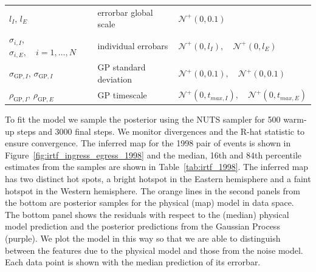 \documentclass[modern]{aastex62}
\begin{document}
\begin{table}[t!]
\begin{center}
\begin{longtable}{W{l}{4cm} W{l}{4cm} W{l}{6cm}}
            \\
            $l_I$, $l_E$& errorbar global scale&$\mathcal{N}^+(0,0.1)$
            \\
            $\sigma_{i,I}$, $\sigma_{i,E},\quad i=1,\dots,N$& individual errobars&
            $\mathcal{N}^+(0,l_I),\quad \mathcal{N}^+(0,l_E)$
            \\
            $\sigma_{\mathrm{GP}, I}$, $\sigma_{\mathrm{GP}, I}$ & GP standard deviation&$\mathcal{N}^+(0,0.1),\quad \mathcal{N}^+(0,0.1)$
            \\
            $\rho_{\mathrm{GP},I}$, $\rho_{\mathrm{GP},E}$ & GP timescale  & $\mathcal{N}^+(0, t_{max, I}),\quad  \mathcal{N}^+(0, t_{max, E})$
        \\
        \end{longtable}
    \end{center}
\end{table}

To fit the model we sample the posterior using the NUTS sampler for 500 warm-up steps and 3000 final steps.
We monitor divergences and the R-hat statistic to ensure convergence.
The inferred map for the 1998 pair of events is shown in Figure~\ref{fig:irtf_ingress_egress_1998} and the median, 16th and 84th percentile estimates from the samples are shown in Table~\ref{tab:irtf_1998}. 
The inferred map has two distinct hot spots, a bright hotspot in the Eastern hemisphere and a faint hotspot in the Western hemisphere.
The orange lines in the second panels from the bottom are posterior samples for the physical (map) model in data space. 
The bottom panel shows the residuals with respect to the (median) physical model prediction and the posterior predictions from the Gaussian Process (purple).
We plot the model in this way so that we are able to distinguish between the features due to the physical model and those from the noise model.
Each data point is shown with the median prediction of its errorbar.
\end{document}
